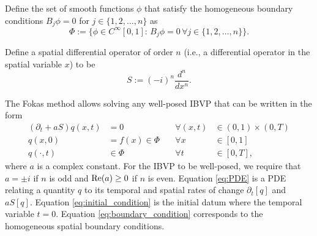 \documentclass[11pt, oneside, a4paper]{article}
\begin{document}
Define the set of smooth functions $\phi$ that satisfy the homogeneous boundary conditions $B_j\phi=0$ for $j\in\{1,2,\ldots,n\}$ as
\begin{equation}\label{eq:Phi}
    \Phi:=\{\phi\in C^\infty[0,1]:\, B_j\phi = 0\,\forall j\in\{1,2,\ldots,n\}\}.
\end{equation}

Define a spatial differential operator of order $n$ (i.e., a differential operator in the spatial variable $x$) to be
\begin{equation}\label{eq:S}
    S := (-i)^n \frac{d^n}{dx^n}.
\end{equation}

The Fokas method allows solving any well-posed IBVP that can be written in the form
\begin{subequations}\label{eq:IBVP}
    \begin{alignat}{3}
        (\partial_t + aS)q(x,t) &= 0\quad &\forall (x,t)&\in (0,1)\times (0,T) \label{eq:PDE}\\
        q(x,0) &= f(x)\in \Phi\quad &\forall x&\in [0,1]\label{eq:initial_condition}\\
        q(\cdot, t) &\in \Phi \quad &\forall t&\in [0,T],\label{eq:boundary_condition}
    \end{alignat}
\end{subequations}
where $a$ is a complex constant. For the IBVP to be well-posed, we require that $a=\pm i$ if $n$ is odd and $\mathrm{Re}(a)\geq 0$ if $n$ is even. Equation \eqref{eq:PDE} is a PDE relating a quantity $q$ to its temporal and spatial rates of change $\partial_t[q]$ and $aS[q]$. Equation \eqref{eq:initial_condition} is the initial datum where the temporal variable $t=0$. Equation \eqref{eq:boundary_condition} corresponds to the homogeneous spatial boundary conditions. 
\end{document}

